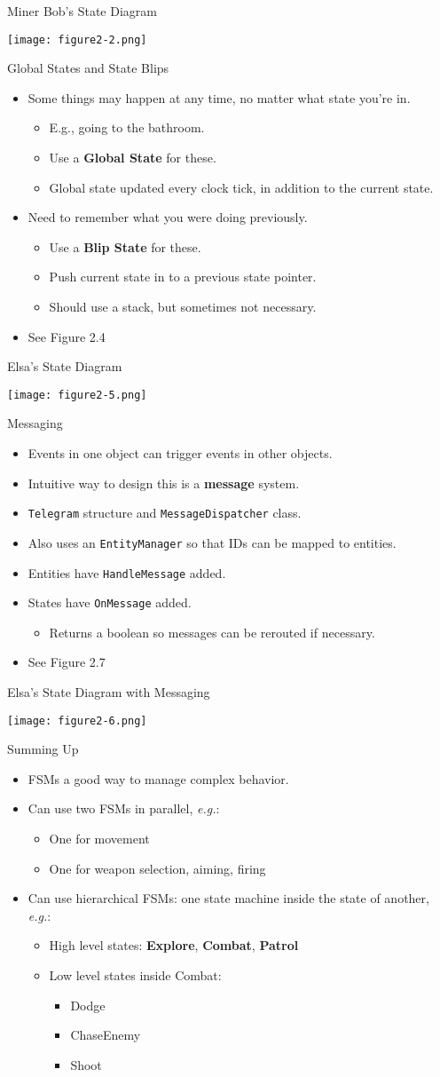 \documentclass[handout,t,compress]{beamer}
\newcommand{\bi}{\begin{itemize}}
\newcommand{\li}{\item}
\newcommand{\ei}{\end{itemize}}
\newcommand{\sect}[1]{\begin{frame}[fragile]{#1}}
\begin{document}
\sect{Miner Bob's State Diagram}

\bigskip

\texttt{[image: figure2-2.png]}
\end{frame}

\sect{Global States and State Blips}

\bi
\li Some things may happen at any time, no matter what state you're in.
\bi
\li E.g., going to the bathroom.
\li Use a {\bf Global State} for these.
\li Global state updated every clock tick, in addition to the current
state. 
\ei

\li Need to remember what you were doing previously.
\bi
\li Use a {\bf Blip State} for these.
\li Push current state in to a previous state pointer.
\li Should use a stack, but sometimes not necessary.
\ei
\li See Figure 2.4
\ei

\end{frame}


\sect{Elsa's State Diagram}

\bigskip

\texttt{[image: figure2-5.png]}
\end{frame} 

\sect{Messaging}
\bi
\li Events in one object can trigger events in other objects.
\li Intuitive way to design this is a {\bf message} system.
\li {\tt Telegram} structure and {\tt MessageDispatcher} class.
\li Also uses an {\tt EntityManager} so that IDs can be mapped to
entities. 
\li Entities have {\tt HandleMessage} added.
\li States have {\tt OnMessage} added.
\bi
\li Returns a boolean so messages can be rerouted if necessary.
\ei
\li See Figure 2.7
\ei
\end{frame}

\sect{Elsa's State Diagram with Messaging}

\bigskip

\texttt{[image: figure2-6.png]}
\end{frame}

\sect{Summing Up}

\bi
\li FSMs a good way to manage complex behavior.
\li Can use two FSMs in parallel, {\em e.g.}:
  \bi
  \li One for movement
  \li One for weapon selection, aiming, firing
  \ei
\li Can use hierarchical FSMs:
 one state machine inside the state of another, {\em e.g.}:
  \bi
  \li High level states:  {\bf Explore}, {\bf Combat}, {\bf Patrol}
  \li Low level states inside Combat:
  \bi \li Dodge \li ChaseEnemy \li Shoot \ei
  \ei
\ei

\end{frame}
\end{document}
